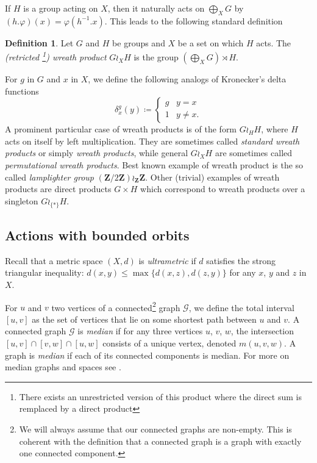 \documentclass[a4paper]{article}
\theoremstyle{definition}
\newtheorem{defn}[lem]{Definition}
\newcommand*{\field}[1]{\mathbf{#1}}
\newcommand*{\Z}{\field{Z}}
\begin{document}
If $H$ is a group acting on $X$, then it naturally acts on $\bigoplus_XG$
by $(h.\varphi)(x)=\varphi(h^{-1}.x)$.
This leads to the following standard definition
\begin{defn}\label{Def:WreathProd}
Let $G$ and $H$ be groups and $X$ be a set on which $H$ acts.
The \emph{(retricted \footnote{There exists an unrestricted version of this product where the direct sum is remplaced by a direct product}) wreath product} $G\wr_XH$ is the group $(\bigoplus_XG)\rtimes H$.
\end{defn}
For $g$ in $G$ and $x$ in $X$, we define the following analogs of Kronecker's delta functions
\begin{equation*}
\delta_x^g (y) \coloneqq
\begin{cases}
g & y = x \\
1 & y \neq x.
\end{cases}
\end{equation*}
A prominent particular case of wreath products is of the form $G\wr_HH$, where $H$ acts on itself by left multiplication.
They are sometimes called \emph{standard wreath products} or simply \emph{wreath products}, while general $G\wr_XH$ are sometimes called \emph{permutational wreath products}.
Best known example of wreath product is the so called \emph{lamplighter group} $(\Z/2\Z)\wr_\Z\Z$.
Other (trivial) examples of wreath products are direct products $G\times H$ which correspond to wreath products over a singleton $G\wr_{\{*\}}H$.
%
%
%
%
%
%
%
%
%
%
\subsection{Actions with bounded orbits}
%
%
%
Recall that a metric space $(X,d)$ is \emph{ultrametric} if $d$ satisfies the strong triangular inequality: $d(x,y)\leq\max\{d(x,z),d(z,y)\}$ for any $x$, $y$ and $z$ in $X$. 

For $u$ and $v$ two vertices of a connected\footnote{We will always assume that our connected graphs are non-empty. This is coherent with the definition that a connected graph is a graph with exactly one connected component.} graph $\mathcal G$, we define the total interval $[u,v]$ as the set of vertices that lie on some shortest path between $u$ and $v$.
A connected graph $\mathcal G$ is \emph{median} if for any three vertices $u$, $v$, $w$, the intersection $[u,v]\cap[v,w]\cap[u,w]$ consists of a unique vertex, denoted $m(u,v,w)$.
A graph is \emph{median} if each of its connected components is median. For more on median graphs and spaces see \cite{MR2405677,MR2671183,MR1705337}.
%
%
%
%
\end{document}
